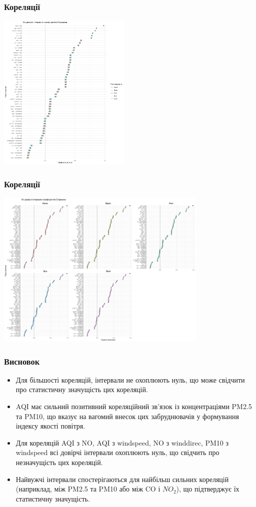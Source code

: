 \documentclass{beamer}
\begin{document}
\begin{frame}
  \frametitle{Кореляції}

  \begin{center}
    \includegraphics[height=3in]{plots/lab2/3-part/ci_intervals_v1.png}
  \end{center}
\end{frame}

\begin{frame}
  \frametitle{Кореляції}

  \begin{center}
    \includegraphics[height=3in]{plots/lab2/3-part/ci_intervals_v2.png}
  \end{center}
\end{frame}

\begin{frame}
  \frametitle{Висновок}

  \begin{itemize}
    \item Для більшості кореляцій, інтервали не охоплюють нуль, що може свідчити про статистичну значущість цих кореляцій.
    \item AQI має сильний позитивний кореляційний зв'язок із концентраціями PM2.5 та PM10, що вказує на вагомий внесок цих забруднювачів у формування індексу якості повітря.
    \item Для кореляцій AQI з NO, AQI з windspeed, NO з winddirec, PM10 з windspeed всі довірчі інтервали охоплюють нуль, що свідчить про незначущість цих кореляцій.
    \item Найвужчі інтервали спостерігаються для найбільш сильних кореляцій (наприклад, між PM2.5 та PM10 або між CO і $NO_2$), що підтверджує їх статистичну значущість.
  \end{itemize}
\end{frame}
\end{document}
